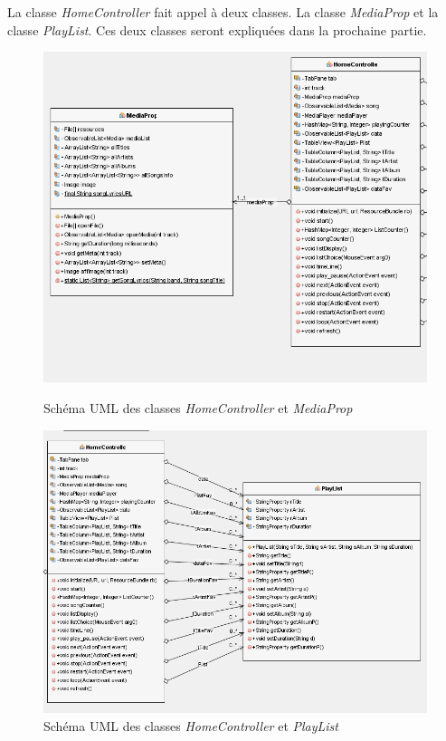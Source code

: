 \documentclass[a4paper,12pt]{report} %
\begin{document}
	\newpage
	La classe \textit{HomeController} fait appel à deux classes. La classe \textit{MediaProp} et la classe \textit{PlayList}. Ces deux classes seront expliquées dans la prochaine partie.
	
	\begin{figure}[ht] 		
		\centering
  		\includegraphics[scale=0.55]{C-M} 
  		\caption{Schéma UML des classes \textit{HomeController} et \textit{MediaProp}}
  		
  		\vspace{1cm}
  		
  		\includegraphics[scale=0.5]{C-P} 
  		\caption{Schéma UML des classes \textit{HomeController} et \textit{PlayList}}
	\end{figure}
	
\end{document}
